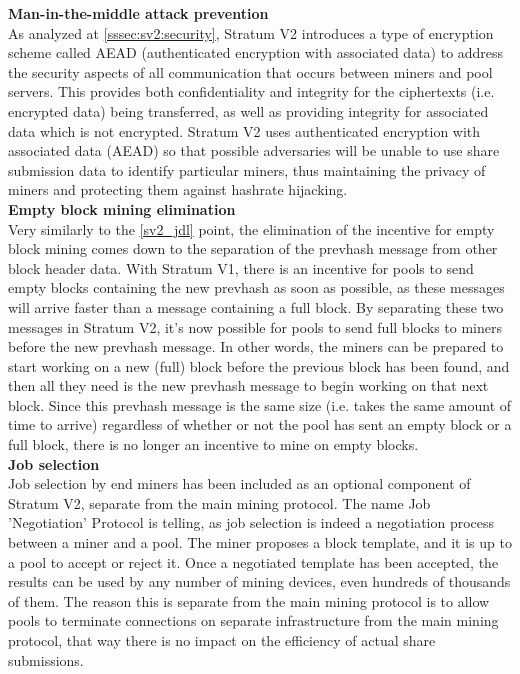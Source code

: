 \noindent\textbf{Man-in-the-middle attack prevention}\\
As analyzed at \ref{sssec:sv2:security}, Stratum V2 introduces a type of encryption scheme called AEAD (authenticated encryption with associated data) to address the security aspects of all communication that occurs between miners and pool servers. This provides both confidentiality and integrity for the ciphertexts (i.e. encrypted data) being transferred, as well as providing integrity for associated data which is not encrypted. Stratum V2 uses authenticated encryption with associated data (AEAD) so that possible adversaries will be unable to use share submission data to identify particular miners, thus maintaining the privacy of miners and protecting them against hashrate hijacking.\\

\noindent\textbf{Empty block mining elimination}\\
Very similarly to the \ref{sv2_jdl} point, the elimination of the incentive for empty block mining comes down to the separation of the prevhash message from other block header data. With Stratum V1, there is an incentive for pools to send empty blocks containing the new prevhash as soon as possible, as these messages will arrive faster than a message containing a full block. By separating these two messages in Stratum V2, it's now possible for pools to send full blocks to miners before the new prevhash message. In other words, the miners can be prepared to start working on a new (full) block before the previous block has been found, and then all they need is the new prevhash message to begin working on that next block. Since this prevhash message is the same size (i.e. takes the same amount of time to arrive) regardless of whether or not the pool has sent an empty block or a full block, there is no longer an incentive to mine on empty blocks.\\

\noindent\textbf{Job selection}\\
Job selection by end miners has been included as an optional component of Stratum V2, separate from the main mining protocol. 
The name Job 'Negotiation' Protocol is telling, as job selection is indeed a negotiation process between a miner and a pool. The miner proposes a block template, and it is up to a pool to accept or reject it. Once a negotiated template has been accepted, the results can be used by any number of mining devices, even hundreds of thousands of them. The reason this is separate from the main mining protocol is to allow pools to terminate connections on separate infrastructure from the main mining protocol, that way there is no impact on the efficiency of actual share submissions.\\


